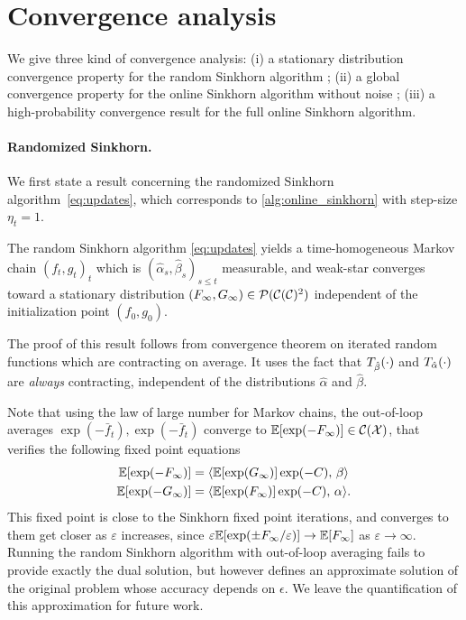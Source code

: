 

\section{Convergence analysis}

We give three kind of convergence analysis: (i) a stationary distribution convergence property for the random Sinkhorn
algorithm ; (ii) a global convergence property for the online Sinkhorn algorithm without noise ; (iii) a high-probability convergence result for the full online Sinkhorn algorithm.

\paragraph{Randomized Sinkhorn.}

We first state a result concerning the randomized Sinkhorn algorithm~\eqref{eq:updates}, which corresponds to
\autoref{alg:online_sinkhorn} with step-size $\eta_t = 1$.

\begin{proposition}\label{prop:markov}
    The random Sinkhorn algorithm \eqref{eq:updates} yields a time-homogeneous
    Markov chain ${(f_t, g_t)}_t$ which is $(\hat \alpha_s, \hat \beta_s)_{s \leq
    t}$ measurable, and weak-star converges toward a stationary distribution
    $(F_\infty, G_\infty) \in \mathcal{P}(\mathcal{C}(\mathcal{C})^2)$ independent of the initialization
    point $(f_0, g_0)$.
\end{proposition}

The proof of this result follows from \citep{diaconis_iterated} convergence theorem on
iterated random functions which are contracting on average. 
%
It uses the fact that
$T_{\hat \beta}(\cdot)$ and $T_{\hat \alpha}(\cdot)$ are \textit{always}
contracting, independent of the distributions $\hat \alpha$ and $\hat \beta$.

Note that using the law of large number for Markov chains, the out-of-loop averages
$\exp(-\bar f_t), \exp(-\bar f_t)$ converge to $\mathbb{E}[\exp(-F_\infty)] \in
\mathcal{C}(\mathcal{X})$, that verifies the following fixed point equations
\begin{align}
    \mathbb{E}[\exp(-F_\infty)] &=
     \langle \mathbb{E}[\exp(G_\infty)] \exp(-C),\,\beta\rangle \\
    \mathbb{E}[\exp(-G_\infty)] &=
     \langle \mathbb{E}[\exp(F_\infty)] \exp(-C),\,\alpha\rangle.
\end{align}
This fixed point is close to the Sinkhorn fixed point iterations, and converges to them 
get closer as $\varepsilon$ increases, since $\varepsilon \mathbb{E}[\exp(\pm F_\infty /
\varepsilon)] \to \mathbb{E}[F_\infty]$ as $\varepsilon \to \infty$. Running the random
Sinkhorn algorithm with out-of-loop averaging fails to provide exactly the dual solution, but 
however defines an approximate solution of the original problem whose accuracy depends on $\epsilon$. 
%
We leave the quantification of this approximation for future work.

